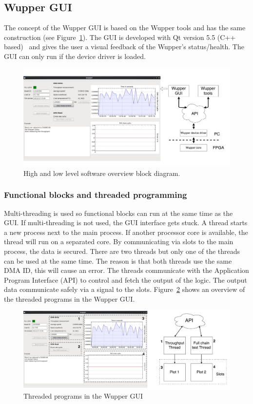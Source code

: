 \newpage


\subsection {Wupper GUI}

The concept of the Wupper GUI is based on the Wupper tools and has the same construction (see Figure~\ref{fig:softwaretree}). The GUI is developed with Qt version 5.5 (C++ based)~\cite{qt} and gives the user a visual feedback of the Wupper's status/health. The GUI can only run if the device driver is loaded.

\begin{figure}[h]
	\centering
	\includegraphics[width = 0.7 \textwidth]{figures/tree.pdf}	
	\caption{High and low level software overview block diagram.}
	\label{fig:softwaretree}
\end{figure}

\subsubsection {Functional blocks and threaded programming}


 Multi-threading is used so functional blocks can run at the same time as the GUI. If multi-threading is not used, the GUI interface gets stuck. A thread starts a new process next to the main process. If another processor core is available, the thread will run on a separated core. By communicating via slots to the main process, the data is secured.
There are two threads but only one of the threads can be used at the same time. The reason is that both threads use the same DMA ID, this will cause an error.
The threads communicate with the Application Program Interface (API) to control and fetch the output of the logic. The output data communicate safely via a signal to the slots. Figure~\ref{fig:guithreads} shows an overview of the threaded programs in the Wupper GUI.

\begin{figure}[h]
	\centering
	\includegraphics[width = 0.9 \textwidth]{figures/wupper_gui_threads_overview.pdf}	
	\caption{Threaded programs in the Wupper GUI}
	\label{fig:guithreads}
\end{figure}

